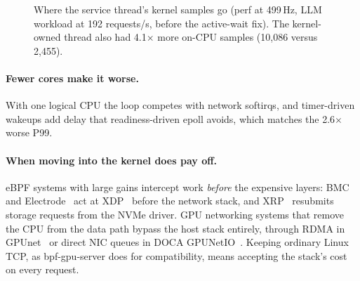 \documentclass[sigconf,nonacm]{acmart}
\begin{document}
\begin{figure}[t]
\centering
{}
\caption{Where the service thread's kernel samples go (perf at 499\,Hz, LLM
workload at 192 requests/s, before the active-wait fix). The kernel-owned
thread also had 4.1$\times$ more on-CPU samples (10,086 versus 2,455).}
\label{fig:profile}
\end{figure}

\paragraph{Fewer cores make it worse.} With one logical CPU the loop competes
with network softirqs, and timer-driven wakeups add delay that readiness-driven
epoll avoids, which matches the 2.6$\times$ worse P99.

\paragraph{When moving into the kernel does pay off.} eBPF systems with large
gains intercept work \emph{before} the expensive layers: BMC~\cite{bmc} and
Electrode~\cite{electrode} act at XDP~\cite{xdp} before the network stack, and
XRP~\cite{xrp} resubmits storage requests from the NVMe driver. GPU networking
systems that remove the CPU from the data path bypass the host stack entirely,
through RDMA in GPUnet~\cite{gpunet} or direct NIC queues in DOCA
GPUNetIO~\cite{gpunetio}. Keeping ordinary Linux TCP, as bpf-gpu-server does for
compatibility, means accepting the stack's cost on every request.
\end{document}

